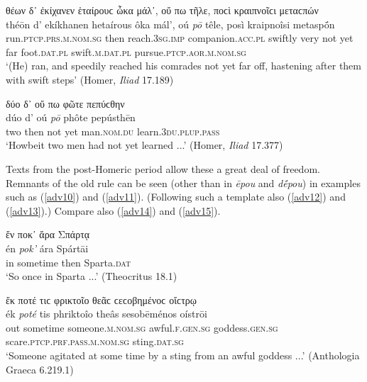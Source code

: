 \begin{exe}
\ex θέων δ᾽ ἐκίχανεν ἑταίρουϲ ὦκα μάλ᾽, οὔ πω τῆλε, ποϲὶ κραιπνοῖϲι μεταϲπών\\
\gll théōn d' ekíkhanen hetaírous ôka mál', oú \emph{pō} têle, posì kraipnoîsi metaspṓn\\
run.\textsc{ptcp.prs.m.nom.sg} then reach.\textsc{3sg.imp}
companion.\textsc{acc.pl} swiftly very not yet far foot.\textsc{dat.pl} swift.\textsc{m.dat.pl} pursue.\textsc{ptcp.aor.m.nom.sg}\\
\trans `(He) ran, and speedily reached his comrades not yet far off, hastening after them with swift steps' (Homer, \textit{Iliad} 17.189)
\label{adv8}
\end{exe}

\begin{exe}
\ex δύο δ᾽ οὔ πω φῶτε πεπύϲθην\\
\gll dúo d' oú \emph{pō} phôte pepústhēn\\
two then not yet man.\textsc{nom.du} learn.\textsc{3du.plup.pass}\\
\trans `Howbeit two men had not yet learned ...' (Homer, \textit{Iliad} 17.377)
\label{adv9}
\end{exe}

Texts from the post-Homeric period allow these  a great deal of freedom. Remnants of the old rule can be seen (other than in \textit{ēpou} and \textit{dḗpou}) in examples such as (\ref{adv10}) and (\ref{adv11}). (Following such a template also (\ref{adv12}) and (\ref{adv13}).) Compare also (\ref{adv14}) and (\ref{adv15}).

\begin{exe}
\ex ἔν ποκ᾽ ἄρα Σπάρτᾳ\\
\gll én \emph{pok'} ára Spártāi\\
in sometime then Sparta.\textsc{dat}\\
\trans `So once in Sparta ...' (Theocritus 18.1)
\label{adv10}
\end{exe}

\begin{exe}
\ex ἔκ ποτέ τιϲ φρικτοῖο θεᾶϲ ϲεϲοβημένοϲ οἴϲτρῳ\\
\gll ék \emph{poté} tis phriktoîo theâs sesobēménos oístrōi\\
out sometime someone.\textsc{m.nom.sg} awful.\textsc{f.gen.sg} goddess.\textsc{gen.sg} scare.\textsc{ptcp.prf.pass.m.nom.sg} sting.\textsc{dat.sg}\\
\trans `Someone agitated at some time by a sting from an awful
goddess ...' (Anthologia Graeca 6.219.1)
\label{adv11}
\end{exe}

